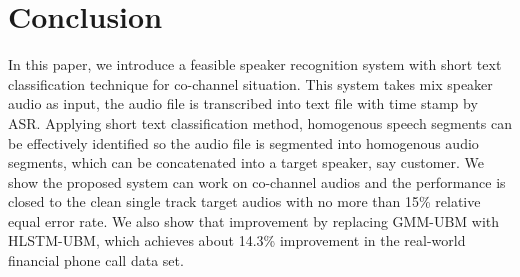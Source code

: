 \section{Conclusion}
\label{sec:conclusion}

In this paper, we introduce a feasible speaker recognition system with short text classification technique for co-channel situation. This system takes mix speaker audio as input, the audio file is transcribed into text file with time stamp by ASR. Applying short text classification method, homogenous speech segments can be effectively identified so the audio file is segmented into homogenous audio segments, which can be concatenated into a target speaker, say customer. We show the proposed system can work on co-channel audios and the performance is closed to the clean single track target audios with no more than 15\% relative equal error rate. We also show that improvement by replacing GMM-UBM with HLSTM-UBM, which achieves about 14.3\% improvement in the real-world financial phone call data set.